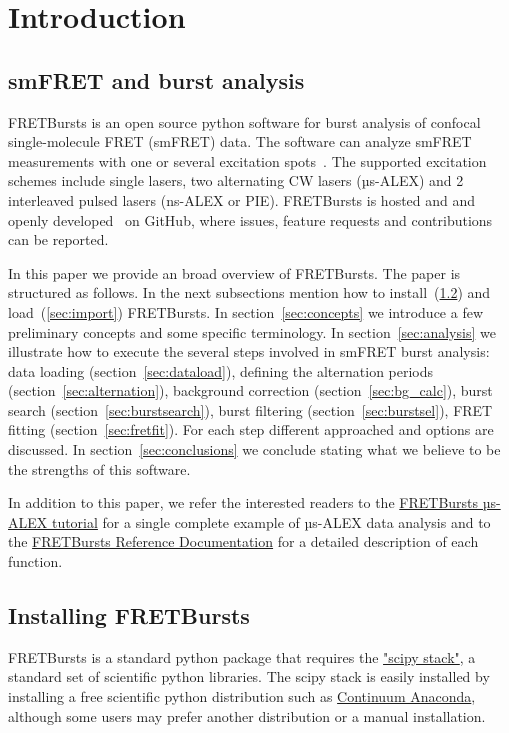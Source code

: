 \section{Introduction}

\subsection{smFRET and burst analysis}

FRETBursts is an open source python software for burst analysis of confocal 
single-molecule FRET (smFRET) data. The software can analyze smFRET measurements
with one or several excitation spots~\cite{Ingargiola_2013}. The supported 
excitation schemes include single lasers, two alternating CW lasers (µs-ALEX\cite{Kapanidis_2005}) 
and 2 interleaved pulsed lasers (ns-ALEX or PIE\cite{M_ller_2005}). 
FRETBursts is hosted and and openly developed~\cite{Prli__2012} on GitHub, where
issues, feature requests and contributions can be reported.

In this paper we provide an broad overview of FRETBursts. 
The paper is structured as follows. 
In the next subsections mention how to install~(\ref{sec:install}) and 
load~(\ref{sec:import}) FRETBursts.
In section~\ref{sec:concepts} we
introduce a few preliminary concepts and some specific terminology.
In section~\ref{sec:analysis} we illustrate how to execute the several steps involved
in smFRET burst analysis: data loading (section~\ref{sec:dataload}), defining the 
alternation periods (section~\ref{sec:alternation}), background 
correction (section~\ref{sec:bg_calc}), burst search (section~\ref{sec:burstsearch}), 
burst filtering (section~\ref{sec:burstsel}), FRET fitting (section~\ref{sec:fretfit}). 
For each step different approached and options are discussed. 
In section~\ref{sec:conclusions} we conclude stating what we believe to be
the strengths of this software.

In addition to this paper, we refer the interested readers to the 
\href{http://nbviewer.ipython.org/github/tritemio/FRETBursts_notebooks/blob/master/notebooks/FRETBursts\%20-\%20us-ALEX\%20smFRET\%20burst\%20analysis.ipynb}{FRETBursts µs-ALEX tutorial} 
for a single complete example of µs-ALEX data analysis and to the
\href{http://fretbursts.readthedocs.org/}{FRETBursts Reference Documentation}
for a detailed description of each function.

\subsection{Installing FRETBursts}
\label{sec:install}
FRETBursts is a standard python package that requires the 
\href{http://www.scipy.org/stackspec.html}{"scipy stack"}, a 
standard set of scientific python libraries.
The scipy stack is easily installed by installing a free scientific python
distribution such as \href{https://store.continuum.io/cshop/anaconda/}{Continuum Anaconda}, 
although some users may prefer another distribution or a manual installation.

